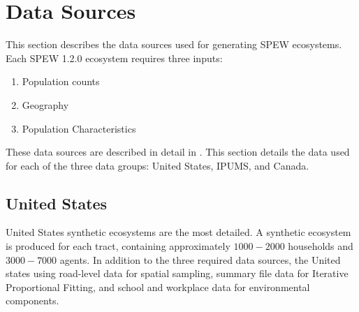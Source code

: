 \documentclass{article}
\begin{document}
\begin{table}[ht]
  \centering 
  \caption{The three data groups for current SPEW 1.2.0 synthetic ecosystems: U.S., IPUMS, and Canada. Count gives the total number of ecosystems in this group, level gives the size of each ecosystem, and region level gives the lowest region level generated \vspace{2em}}
  \label{tab:summary}
 \end{table}

\newpage 
\section{Data Sources}
\label{sec:data}
This section describes the data sources used for generating SPEW ecosystems. Each SPEW 1.2.0 ecosystem requires three inputs:

\begin{enumerate}
	\item Population counts
	\item Geography 
	\item Population Characteristics
\end{enumerate}

These data sources are described in detail in \cite{spew}. This section details the data used for each of the three data groups: United States, IPUMS, and Canada. 

\subsection{United States}	
United States synthetic ecosystems are the most detailed. A synthetic ecosystem is produced for each tract, containing approximately $1000-2000$ households and $3000-7000$ agents. In addition to the three required data sources, the United states using road-level data for spatial sampling, summary file data for Iterative Proportional Fitting, and school and workplace data for environmental components. 
\end{document}
